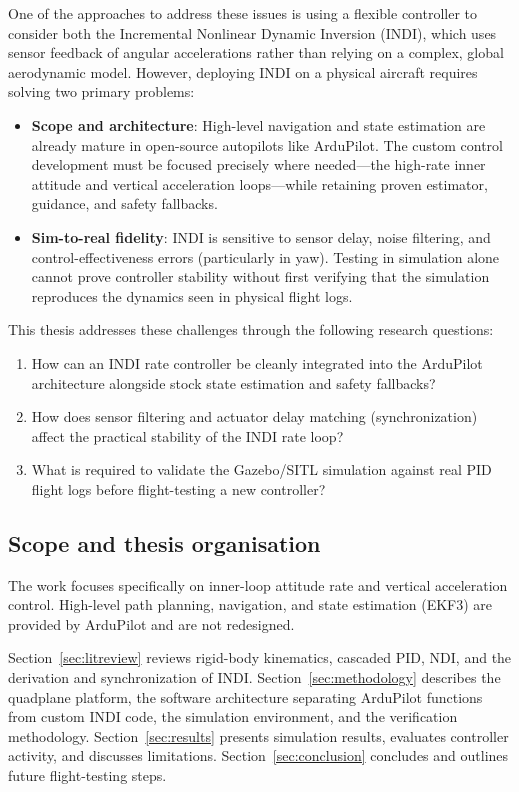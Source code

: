 \documentclass{article}
\begin{document}
One of the approaches to address these issues is using a flexible controller to consider both the 
 Incremental Nonlinear Dynamic Inversion (INDI), which uses sensor feedback of angular accelerations rather than relying on a complex, global aerodynamic model. However, deploying INDI on a physical aircraft requires solving two primary problems:
\begin{itemize}
    \item \textbf{Scope and architecture}: High-level navigation and state estimation are already mature in open-source autopilots like ArduPilot. The custom control development must be focused precisely where needed—the high-rate inner attitude and vertical acceleration loops—while retaining proven estimator, guidance, and safety fallbacks.
    \item \textbf{Sim-to-real fidelity}: INDI is sensitive to sensor delay, noise filtering, and control-effectiveness errors (particularly in yaw). Testing in simulation alone cannot prove controller stability without first verifying that the simulation reproduces the dynamics seen in physical flight logs.
\end{itemize}

This thesis addresses these challenges through the following research questions:
\begin{enumerate}
    \item How can an INDI rate controller be cleanly integrated into the ArduPilot architecture alongside stock state estimation and safety fallbacks?
    \item How does sensor filtering and actuator delay matching (synchronization) affect the practical stability of the INDI rate loop?
    \item What is required to validate the Gazebo/SITL simulation against real PID flight logs before flight-testing a new controller?
\end{enumerate}

\subsection{Scope and thesis organisation}
\label{sec:scope}
The work focuses specifically on inner-loop attitude rate and vertical acceleration control. High-level path planning, navigation, and state estimation (EKF3) are provided by ArduPilot and are not redesigned. 

Section~\ref{sec:litreview} reviews rigid-body kinematics, cascaded PID, NDI, and the derivation and synchronization of INDI. Section~\ref{sec:methodology} describes the quadplane platform, the software architecture separating ArduPilot functions from custom INDI code, the simulation environment, and the verification methodology. Section~\ref{sec:results} presents simulation results, evaluates controller activity, and discusses limitations. Section~\ref{sec:conclusion} concludes and outlines future flight-testing steps.
\end{document}
